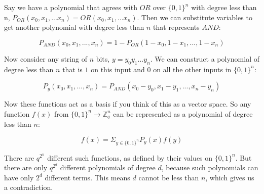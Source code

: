 \documentclass{article}
\newenvironment{problem}[2][Problem]{\begin{trivlist}
\item[\hskip \labelsep {\bfseries #1}\hskip \labelsep {\bfseries #2.}]}{\end{trivlist}}
\begin{document}
\begin{problem}{3}
  Say we have a polynomial that agrees with $OR$ over $\{0,1\}^n$ with
  degree less than n, $P_{OR}(x_0, x_1, ... x_n) = OR(x_0, x_1, ... x_n)$.
  Then we can substitute variables to get another polynomial with
  degree less than $n$ that represents $AND$:

  \begin{equation}
    P_{AND}(x_0, x_1, ..., x_n) = 1 - P_{OR}(1 - x_0, 1 - x_1, ..., 1 - x_n)
  \end{equation}

  Now consider any string of $n$ bits, $y = y_0y_1...y_n$. We can
  construct a polynomial of degree less than $n$ that is $1$ on this
  input and $0$ on all the other inputs in $\{0, 1\}^n$:

  \begin{equation}
    P_y(x_0, x_1, ..., x_n) = P_{AND}(x_0 - y_0, x_1 - y_1, ..., x_n - y_n)
  \end{equation}

  Now these functions act as a basis if you think of this as a vector
  space. So any function $f(x)$ from
  $\{0, 1\}^n \rightarrow \mathbb{Z}_q^n$ can be represented as a
  polynomial of degree less than $n$:

  \begin{equation}
    f(x) = \Sigma_{y \in \{0, 1\}^n}P_y(x)f(y)
  \end{equation}

  There are $q^{2^n}$ different such functions, as defined by their
  values on $\{0, 1\}^n$. But there are only $q^{2^d}$ different
  polynomials of degree $d$, because such polynomials can have only
  $2^d$ different terms. This means $d$ cannot be less than $n$, which
  gives us a contradiction.
\end{problem}
\end{document}
